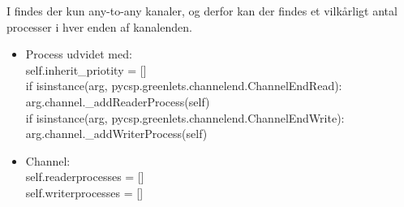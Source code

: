 I \pycsp findes der kun any-to-any kanaler, og derfor kan der findes et vilkårligt antal processer i hver enden af kanalenden. 


\begin{itemize}
\tightlist
\item Process udvidet med: \\self.inherit\_priotity = []     \\
            if isinstance(arg, pycsp.greenlets.channelend.ChannelEndRead):\\
                arg.channel.\_addReaderProcess(self)\\
            if isinstance(arg, pycsp.greenlets.channelend.ChannelEndWrite):\\
                arg.channel.\_addWriterProcess(self)
\item Channel:\\
        self.readerprocesses = []\\
        self.writerprocesses = []
\end{itemize}
